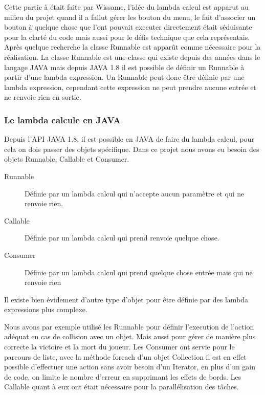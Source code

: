Cette partie à était faite par Wissame, l'idée du lambda calcul est apparut au milieu du projet quand il a fallut gérer les bouton du menu, le fait d'associer un bouton à quelque chose que l'ont pouvait
executer directement était séduisante pour la clarté du code mais aussi pour le défis technique que cela représentais. Après quelque recherche la classe Runnable est apparût comme nécessaire pour
la réalisation.
\ml
La classe Runnable est une classe qui existe depuis des années dans le langage JAVA mais depuis JAVA 1.8 il est possible de définir un Runnable à partir d'une lambda expression. 
\ml
Un Runnable peut donc être définie par une lambda expression, cependant cette expression ne peut prendre aucune entrée et ne renvoie rien en sortie. 

\subsubsection{Le lambda calcule en JAVA}

Depuis l'API JAVA 1.8, il est possible en JAVA de faire du lambda calcul, pour cela on dois passer des objets spécifique. Dans ce projet nous avons eu besoin des objets Runnable, Callable et Consumer.

\begin{description}
\item[Runnable] Définie par un lambda calcul qui n'accepte aucun paramètre et qui ne renvoie rien.
\item[Callable] Définie par un lambda calcul qui prend renvoie quelque chose.
\item[Consumer] Définie par un lambda calcul qui prend quelque chose entrée mais qui ne renvoie rien
\end{description}

Il existe bien évidement d'autre type d'objet pour être définie par des lambda expressions plus complexe.

Nous avons par exemple utilisé les Runnable pour définir l'execution de l'action adéquat en cas de collision avec un objet. Mais aussi pour gérer de manière plus correcte la victoire et la mort du joueur.
\ml
Les Consumer ont servie pour le parcours de liste, avec la méthode foreach d'un objet Collection il est en effet possible d'effectuer une action sans avoir besoin d'un Iterator, en plus d'un gain de code, on limite le nombre d'erreur en supprimant les effets de bords.
\ml
Les Callable quant à eux ont était nécessaire pour la parallélisation des tâches.

